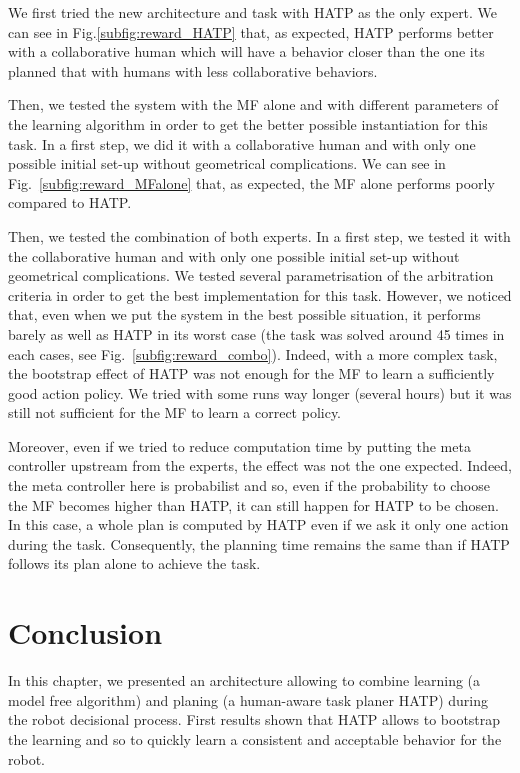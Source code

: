 \documentclass[english,a4paper,11pt,twoside]{StyleThese}
\begin{document}
We first tried the new architecture and task with HATP as the only expert. We can see in Fig.\ref{subfig:reward_HATP} that, as expected, HATP performs better with a collaborative human which will have a behavior closer than the one its planned that with humans with less collaborative behaviors. 

Then, we tested the system with the MF alone and with different parameters of the learning algorithm in order to get the better possible instantiation for this task. In a first step, we did it with a collaborative human and with only one possible initial set-up without geometrical complications. We can see in Fig.~\ref{subfig:reward_MFalone} that, as expected, the MF alone performs poorly compared to HATP.

Then, we tested the combination of both experts. In a first step, we tested it with the collaborative human and with only one possible initial set-up without geometrical complications. We tested several parametrisation of the arbitration criteria in order to get the best implementation for this task. However, we noticed that, even when we put the system in the best possible situation, it performs barely as well as HATP in its worst case (the task was solved around 45 times in each cases, see Fig.~\ref{subfig:reward_combo}). Indeed, with a more complex task, the bootstrap effect of HATP was not enough for the MF to learn a sufficiently good action policy. We tried with some runs way longer (several hours) but it was still not sufficient for the MF to learn a correct policy. 

Moreover, even if we tried to reduce computation time by putting the meta controller upstream from the experts, the effect was not the one expected. Indeed, the meta controller here is probabilist and so, even if the probability to choose the MF becomes higher than HATP, it can still happen for HATP to be chosen. In this case, a whole plan is computed by HATP even if we ask it only one action during the task. Consequently, the planning time remains the same than if HATP follows its plan alone to achieve the task.

\section{Conclusion}

In this chapter, we presented an architecture allowing to combine learning (a model free algorithm) and planing (a human-aware task planer HATP) during the robot decisional process. First results shown that HATP allows to bootstrap the learning and so to quickly learn a consistent and acceptable behavior for the robot.
\end{document}
